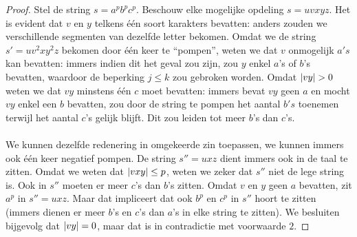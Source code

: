 \documentclass[a4paper]{article}
\begin{document}
\begin{question}
\begin{answer}
\begin{enumerate}
\begin{proof}
Stel de string $s=a^pb^pc^p$. Beschouw elke mogelijke opdeling $s=uvxyz$. Het is evident dat $v$ en $y$ telkens \'e\'en soort karakters bevatten: anders zouden we verschillende segmenten van dezelfde letter bekomen. Omdat we de string $s'=uv^2xy^2z$ bekomen door \'e\'en keer te ``pompen'', weten we dat $v$ onmogelijk $a's$ kan bevatten: immers indien dit het geval zou zijn, zou $y$ enkel $a$'s of $b$'s bevatten, waardoor de beperking $j\leq k$ zou gebroken worden. Omdat $\abs{vy}>0$ weten we dat $vy$ minstens \'e\'en $c$ moet bevatten: immers bevat $vy$ geen $a$ en mocht $vy$ enkel een $b$ bevatten, zou door de string te pompen het aantal $b's$ toenemen terwijl het aantal $c$'s gelijk blijft. Dit zou leiden tot meer $b$'s dan $c$'s.
\paragraph{}
We kunnen dezelfde redenering in omgekeerde zin toepassen, we kunnen immers ook \'e\'en keer negatief pompen. De string $s''=uxz$ dient immers ook in de taal te zitten. Omdat we weten dat $\left|vxy\right|\leq p$, weten we zeker dat $s''$ niet de lege string is. Ook in $s''$ moeten er meer $c$'s dan $b$'s zitten. Omdat $v$ en $y$ geen $a$ bevatten, zit $a^p$ in $s''=uxz$. Maar dat impliceert dat ook $b^p$ en $c^p$ in $s''$ hoort te zitten (immers dienen er meer $b$'s en $c$'s dan $a$'s in elke string te zitten). We besluiten bijgevolg dat $\left|vy\right|=0$, maar dat is in contradictie met voorwaarde $2$.
\end{proof}
\end{enumerate}
\end{answer}
\end{question}
\end{document}
